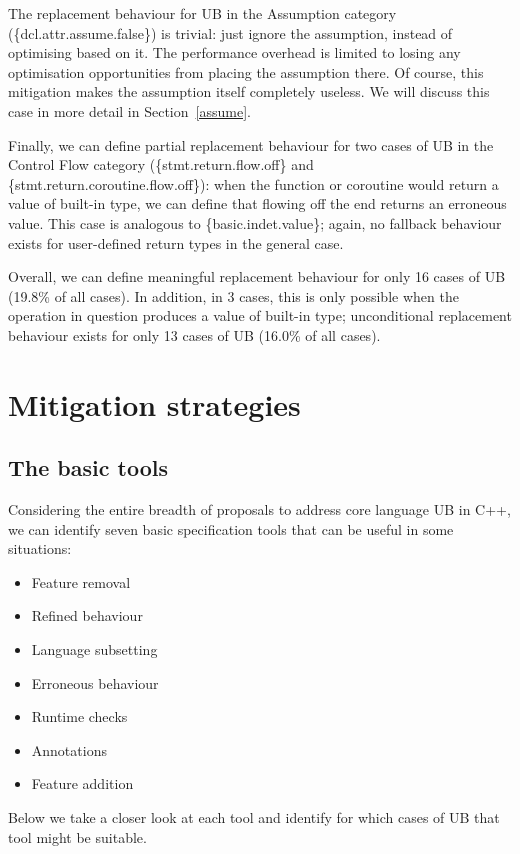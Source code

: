 The replacement behaviour for UB in the Assumption category (\{dcl.attr.assume.false\}) is trivial: just ignore the assumption, instead of optimising based on it. The performance overhead is limited to losing any optimisation opportunities from placing the assumption there. Of course, this mitigation makes the assumption itself completely useless. We will discuss this case in more detail in Section~\ref{assume}.

Finally, we can define partial replacement behaviour for two cases of UB in the Control Flow category  (\{stmt.return.flow.off\} and \{stmt.return.coroutine.flow.off\}): when the function or coroutine would return a value of built-in type, we can define that flowing off the end returns an erroneous value. This case is analogous to \{basic.indet.value\}; again, no fallback behaviour exists for user-defined return types in the general case.

Overall, we can define meaningful replacement behaviour for only 16 cases of UB (19.8\% of all cases). In addition, in 3 cases, this is only possible when the operation in question produces a value of built-in type; unconditional replacement behaviour exists for only 13 cases of UB (16.0\% of all cases).

\section{Mitigation strategies}
\label{mitigation}

\subsection{The basic tools}

Considering the entire breadth of proposals to address core language UB in C++, we can identify seven basic specification tools that can be useful in some situations:

\begin{itemize}
\item Feature removal
\item Refined behaviour
\item Language subsetting
\item Erroneous behaviour
\item Runtime checks
\item Annotations
\item Feature addition
\end{itemize}

Below we take a closer look at each tool and identify for which cases of UB that tool might be suitable.

